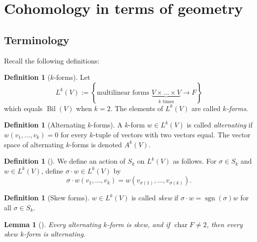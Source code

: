 \documentclass[reqno]{amsart}
\newtheorem{lemma}[theorem]{Lemma}
\theoremstyle{definition}
\newtheorem{definition}[theorem]{Definition}
\theoremstyle{remark}
\DeclareMathOperator{\sgn}{sgn}
\DeclareMathOperator{\Bil}{Bil}
\DeclareMathOperator{\Char}{char}
\begin{document}
     \section{Cohomology in terms of geometry}

     \subsection{Terminology}


     Recall the following definitions:

     \begin{definition}[$k$-forms]
         Let
         \[
         L^{k}(V) := 
         \left\{ \text{multilinear forms }
         \underbrace{V \times \ldots \times V}_{k \text{ times}}
     \to F \right\} 
         \] 
         which equals $\Bil (V)$ when $k = 2$.
         The elements of $L^{k}(V)$ are called
         \textit{$k$-forms}.
     \end{definition}

     \begin{definition}[Alternating $k$-forms]
         A $k$-form $w \in L^{k}(V)$ is called
         \textit{alternating} if $w\left( v_1,\ldots,
         v_k\right) = 0$ for every $k$-tuple of vectors
         with two vectors equal.
         The vector space of alternating $k$-forms
         is denoted
         $A^{k}(V)$.
     \end{definition}

     \begin{definition}[]
         We define an action
         of $S_k$ on $L^{k}(V)$ as follows.
         For $\sigma \in S_k$ and $w \in L^{k}(V)$, define
         $\sigma \cdot w \in L^{k}(V)$ by
         \[
         \sigma \cdot w\left( v_1, \ldots, v_k \right) 
         = 
         w \left( v_{\sigma (1)},\ldots,
         v_{\sigma (k)}\right) .
         \] 
     \end{definition}

     \begin{definition}[Skew forms]
         $w \in L^{k}(V)$ is called
         \textit{skew} if $\sigma \cdot w = 
         \sgn (\sigma) w$ for all
         $\sigma \in S_k$.
     \end{definition}

     \begin{lemma}[]
         Every alternating $k$-form is skew, and
         if $\Char F \neq 2$, then every skew
         $k$-form is alternating.
     \end{lemma}
\end{document}

